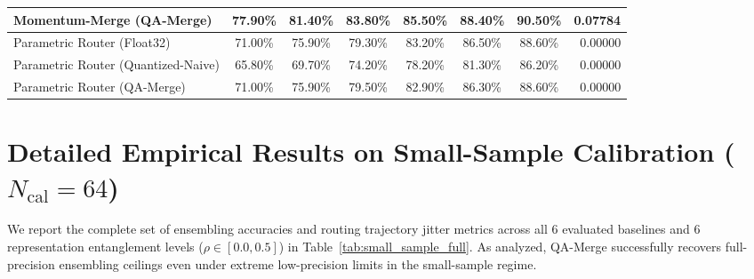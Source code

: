 \documentclass{article}
\theoremstyle{plain}
\theoremstyle{definition}
\theoremstyle{remark}
\begin{document}
\begin{table}[t]
\begin{center}
\begin{small}
\begin{sc}
\begin{tabular}{lccccccr}
Momentum-Merge (QA-Merge) & 77.90\% & 81.40\% & 83.80\% & 85.50\% & 88.40\% & 90.50\% & 0.07784 \\
\midrule
Parametric Router (Float32) & 71.00\% & 75.90\% & 79.30\% & 83.20\% & 86.50\% & 88.60\% & 0.00000 \\
Parametric Router (Quantized-Naive) & 65.80\% & 69.70\% & 74.20\% & 78.20\% & 81.30\% & 86.20\% & 0.00000 \\
Parametric Router (QA-Merge) & 71.00\% & 75.90\% & 79.50\% & 82.90\% & 86.30\% & 88.60\% & 0.00000 \\
\bottomrule
\end{tabular}
\end{sc}
\end{small}
\end{center}
\vskip -0.1in
\end{table}

\section{Detailed Empirical Results on Small-Sample Calibration ($N_{\text{cal}} = 64$)}
\label{app:small_sample_results}

We report the complete set of ensembling accuracies and routing trajectory jitter metrics across all 6 evaluated baselines and 6 representation entanglement levels ($\rho \in [0.0, 0.5]$) in Table~\ref{tab:small_sample_full}. As analyzed, QA-Merge successfully recovers full-precision ensembling ceilings even under extreme low-precision limits in the small-sample regime.
\end{document}
